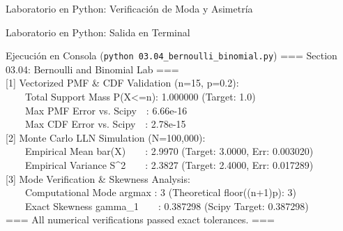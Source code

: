 \documentclass[10pt, aspectratio=169]{beamer}
\begin{document}
\begin{frame}[fragile]{Laboratorio en Python: Verificación de Moda y Asimetría}
  
\end{frame}

\begin{frame}[fragile]{Laboratorio en Python: Salida en Terminal}
  \begin{block}{Ejecución en Consola (\texttt{python 03.04\_bernoulli\_binomial.py})}
    \fontsize{6pt}{7pt}\selectfont\ttfamily
=== Section 03.04: Bernoulli and Binomial Lab ===\\[0.08cm]
{[1]} Vectorized PMF \& CDF Validation (n=15, p=0.2):\\
\ \ \ \ Total Support Mass P(X<=n): 1.000000 (Target: 1.0)\\
\ \ \ \ Max PMF Error vs. Scipy\ \ : 6.66e-16\\
\ \ \ \ Max CDF Error vs. Scipy\ \ : 2.78e-15\\[0.08cm]
{[2]} Monte Carlo LLN Simulation (N=100,000):\\
\ \ \ \ Empirical Mean bar(X)\ \ \ \ : 2.9970 (Target: 3.0000, Err: 0.003020)\\
\ \ \ \ Empirical Variance S\^{}2\ \ \ \ : 2.3827 (Target: 2.4000, Err: 0.017289)\\[0.08cm]
{[3]} Mode Verification \& Skewness Analysis:\\
\ \ \ \ Computational Mode argmax : 3 (Theoretical floor((n+1)p): 3)\\
\ \ \ \ Exact Skewness gamma\_1\ \ \ \ : 0.387298 (Scipy Target: 0.387298)\\[0.08cm]
=== All numerical verifications passed exact tolerances. ===
  \end{block}
\end{frame}
\end{document}
